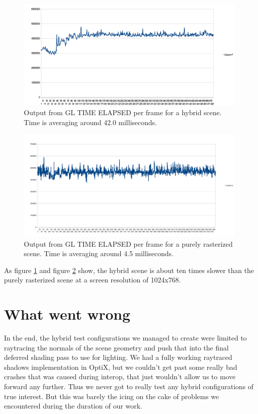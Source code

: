 \begin{figure}[H]
	\centering
	\includegraphics[width=1.00\textwidth]{Media/gpu_timer_hybrid.png}
	\caption{Output from GL TIME ELAPSED per frame for a hybrid scene. Time is averaging around 42.0 milliseconds.}	
	\label{fig:hybrid_gpu_time}
\end{figure}

\begin{figure}[H]
	\centering
	\includegraphics[width=1.00\textwidth]{Media/gpu_timer_raster_only.png}
	\caption{Output from GL TIME ELAPSED per frame for a purely rasterized scene. Time is averaging around 4.5 milliseconds.}
	\label{fig:raster_gpu_time}
\end{figure}

As figure \ref{fig:hybrid_gpu_time} and figure \ref{fig:raster_gpu_time} show, the hybrid scene is about ten times slower than the purely rasterized scene at a screen resolution of 1024x768.

\section{What went wrong}
In the end, the hybrid test configurations we managed to create were limited to raytracing the normals of the scene geometry and push that into the final deferred shading pass to use for lighting. We had a fully working raytraced shadows implementation in OptiX, but we couldn't get past some really bad crashes that was caused during interop, that just wouldn't allow us to move forward any further. Thus we never got to really test any hybrid configurations of true interest. But this was barely the icing on the cake of problems we encountered during the duration of our work.


